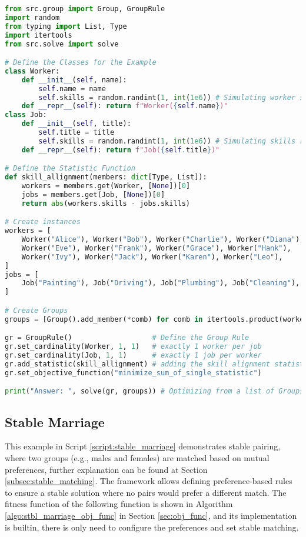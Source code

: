 \begin{lstlisting}[language=Python, caption={Creating and solving the Job Assignment Problem using this framework.}, label={script:job_assignement}]
from src.group import Group, GroupRule
import random
from typing import List, Type
import itertools
from src.solve import solve

# Define the Classes for the Example
class Worker:
    def __init__(self, name):
        self.name = name
        self.skills = random.randint(1, int(1e6)) # Simulating worker skill level
    def __repr__(self): return f"Worker({self.name})"
class Job:
    def __init__(self, title):
        self.title = title
        self.skills = random.randint(1, int(1e6)) # Simulating skills required
    def __repr__(self): return f"Job({self.title})"

# Define the Statistic Function
def skill_allignment(members: dict[Type, List]):
    workers = members.get(Worker, [None])[0]
    jobs = members.get(Job, [None])[0]
    return abs(workers.skills - jobs.skills)

# Create instances
workers = [
    Worker("Alice"), Worker("Bob"), Worker("Charlie"), Worker("Diana"),
    Worker("Eve"), Worker("Frank"), Worker("Grace"), Worker("Hank"),
    Worker("Ivy"), Worker("Jack"), Worker("Karen"), Worker("Leo"),
]
jobs = [
    Job("Painting"), Job("Driving"), Job("Plumbing"), Job("Cleaning"), Job("Gardening")
]

# Create Groups
groups = [Group().add_member(*comb) for comb in itertools.product(workers, jobs)]

gr = GroupRule()                   # Define the Group Rule
gr.set_cardinality(Worker, 1, 1)   # exactly 1 worker per job
gr.set_cardinality(Job, 1, 1)      # exactly 1 job per worker
gr.add_statistic(skill_allignment) # adding the skill alignment statistic
gr.set_objective_function("minimize_sum_of_single_statistic")

print("Answer: ", solve(gr, groups)) # Optimizing from a list of Groups
\end{lstlisting}


\subsection{Stable Marriage}
This example in Script \ref{script:stable_marriage} demonstrates stable pairing, where two groups (e.g., males and females) are matched based on mutual preferences, further explanation can be found at Section \ref{subsec:stable_matching}. The framework allows defining preference-based rules to ensure a stable solution where no pairs would prefer a different match.
The fitness function of the following function is shown in Algorithm \ref{algo:stbl_marriage_obj_func} in Section \ref{sec:obj_func}, and its implementation is builtin, there is only need to configure the preferences and set stable matching.

